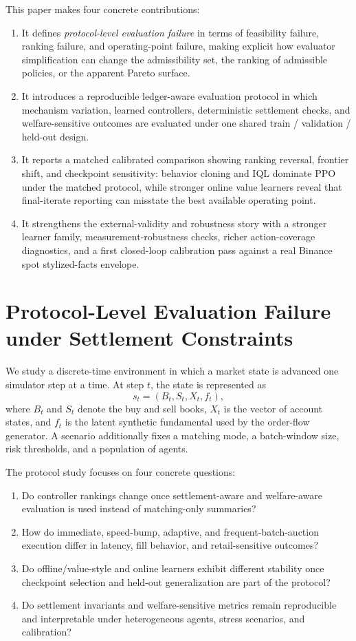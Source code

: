 \documentclass[11pt]{article}
\begin{document}
This paper makes four concrete contributions:
\begin{enumerate}[leftmargin=*]
  \item It defines \emph{protocol-level evaluation failure} in terms of feasibility failure, ranking failure, and operating-point failure, making explicit how evaluator simplification can change the admissibility set, the ranking of admissible policies, or the apparent Pareto surface.
  \item It introduces a reproducible ledger-aware evaluation protocol in which mechanism variation, learned controllers, deterministic settlement checks, and welfare-sensitive outcomes are evaluated under one shared train / validation / held-out design.
  \item It reports a matched calibrated comparison showing ranking reversal, frontier shift, and checkpoint sensitivity: behavior cloning and IQL dominate PPO under the matched protocol, while stronger online value learners reveal that final-iterate reporting can misstate the best available operating point.
  \item It strengthens the external-validity and robustness story with a stronger learner family, measurement-robustness checks, richer action-coverage diagnostics, and a first closed-loop calibration pass against a real Binance spot stylized-facts envelope.
\end{enumerate}

\section{Protocol-Level Evaluation Failure under Settlement Constraints}
We study a discrete-time environment in which a market state is advanced one simulator step at a time. At step $t$, the state is represented as
\[
s_t = (B_t, S_t, X_t, f_t),
\]
where $B_t$ and $S_t$ denote the buy and sell books, $X_t$ is the vector of account states, and $f_t$ is the latent synthetic fundamental used by the order-flow generator. A scenario additionally fixes a matching mode, a batch-window size, risk thresholds, and a population of agents.

The protocol study focuses on four concrete questions:
\begin{enumerate}[leftmargin=*]
  \item Do controller rankings change once settlement-aware and welfare-aware evaluation is used instead of matching-only summaries?
  \item How do immediate, speed-bump, adaptive, and frequent-batch-auction execution differ in latency, fill behavior, and retail-sensitive outcomes?
  \item Do offline/value-style and online learners exhibit different stability once checkpoint selection and held-out generalization are part of the protocol?
  \item Do settlement invariants and welfare-sensitive metrics remain reproducible and interpretable under heterogeneous agents, stress scenarios, and calibration?
\end{enumerate}
\end{document}
